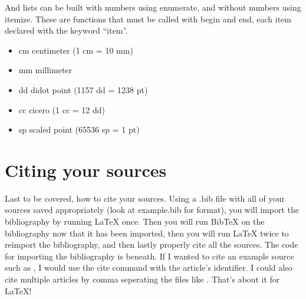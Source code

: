 \documentclass[a4paper, 10pt]{article}
\begin{document}
And lists can be built with numbers using enumerate, and without
numbers using itemize.  These are functions that must be called with
begin and end, each item declared with the keyword ``item''.

\begin{itemize}
\item
    cm  centimeter    (1 cm = 10 mm)
\item
    mm  millimeter
\item
    dd  didot point   (1157 dd = 1238 pt)
\item
    cc  cicero        (1 cc = 12 dd)
\item
    sp  scaled point  (65536 sp = 1 pt)
\end{itemize}

\section*{Citing your sources}
Last to be covered, how to cite your sources.  Using a .bib file with
all of your sources saved appropriately (look at example.bib for
format), you will import the bibliography by running LaTeX once. Then
you will run BibTeX on the bibliography now that it has been imported,
then you will run LaTeX twice to reimport the bibliography, and then
lastly properly cite all the sources.  The code for importing the
bibliography is beneath.  If I wanted to cite an example source such
as \cite{examplebib2013}, I would use the cite command with the
article's identifier.  I could also cite multiple articles by comma
seperating the files like \cite{examplebib2013, goossens93}.  That's
about it for LaTeX!

\end{document}
